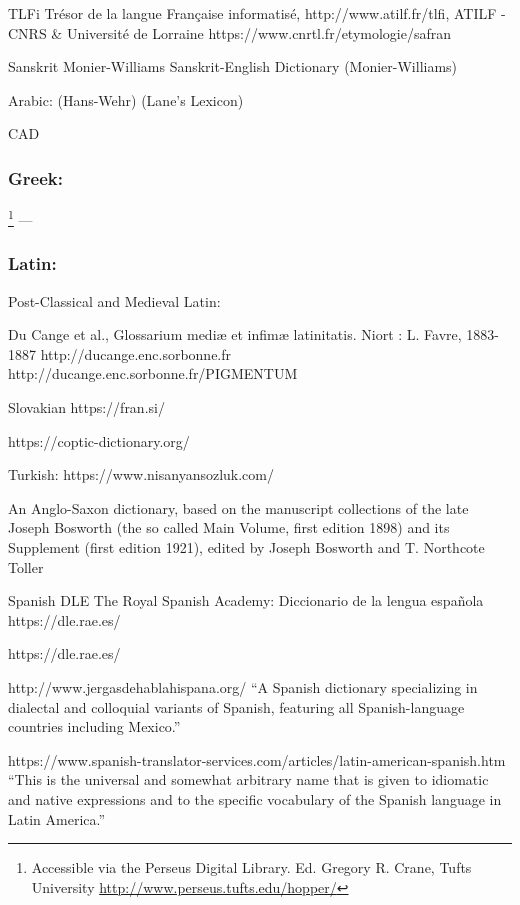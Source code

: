 TLFi Trésor de la langue Française informatisé, http://www.atilf.fr/tlfi, ATILF - CNRS \& Université de Lorraine
https://www.cnrtl.fr/etymologie/safran

Sanskrit
Monier-Williams Sanskrit-English Dictionary (Monier-Williams)

Arabic:
(Hans-Wehr)
(Lane's Lexicon) 

\gls{CAD}

\subsubsection{Greek:}

\footnote{Accessible via the Perseus Digital Library. Ed. Gregory R. Crane, Tufts University \url{http://www.perseus.tufts.edu/hopper/}} --- \parencite{liddell_greek-english_1940}

\subsubsection{Latin:} 


Post-Classical and Medieval Latin:

Du Cange et al., Glossarium mediæ et infimæ latinitatis. Niort : L. Favre, 1883-1887
http://ducange.enc.sorbonne.fr
http://ducange.enc.sorbonne.fr/PIGMENTUM

Slovakian
https://fran.si/

https://coptic-dictionary.org/

Turkish:
https://www.nisanyansozluk.com/

An Anglo-Saxon dictionary, based on the manuscript collections of the late Joseph Bosworth (the so called Main Volume, first edition 1898) and its Supplement (first edition 1921), edited by Joseph Bosworth and T. Northcote Toller

Spanish
DLE
The Royal Spanish Academy: Diccionario de la lengua española https://dle.rae.es/

https://dle.rae.es/

http://www.jergasdehablahispana.org/ ``A Spanish dictionary specializing in dialectal and colloquial variants of Spanish, featuring all Spanish-language countries including Mexico.''

https://www.spanish-translator-services.com/articles/latin-american-spanish.htm
``This is the universal and somewhat arbitrary name that is given to idiomatic and native expressions and to the specific vocabulary of the Spanish language in Latin America.''

